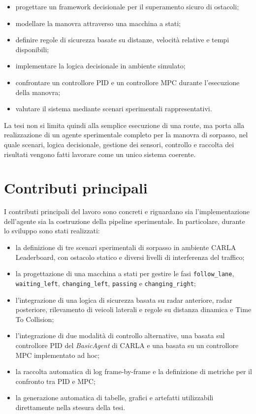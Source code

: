 \begin{itemize}
    \item progettare un framework decisionale per il superamento sicuro di ostacoli;
    \item modellare la manovra attraverso una macchina a stati;
    \item definire regole di sicurezza basate su distanze, velocità relative e tempi disponibili;
    \item implementare la logica decisionale in ambiente simulato;
    \item confrontare un controllore PID e un controllore MPC durante l'esecuzione della manovra;
    \item valutare il sistema mediante scenari sperimentali rappresentativi.
\end{itemize}

La tesi non si limita quindi alla semplice esecuzione di una route, ma porta alla realizzazione di un agente sperimentale completo per la manovra di sorpasso, nel quale scenari, logica decisionale, gestione dei sensori, controllo e raccolta dei risultati vengono fatti lavorare come un unico sistema coerente.

\section{Contributi principali}

I contributi principali del lavoro sono concreti e riguardano sia l'implementazione dell'agente sia la costruzione della pipeline sperimentale. In particolare, durante lo sviluppo sono stati realizzati:

\begin{itemize}
    \item la definizione di tre scenari sperimentali di sorpasso in ambiente CARLA Leaderboard, con ostacolo statico e diversi livelli di interferenza del traffico;
    \item la progettazione di una macchina a stati per gestire le fasi \texttt{follow\_lane}, \texttt{waiting\_left}, \texttt{changing\_left}, \texttt{passing} e \texttt{changing\_right};
    \item l'integrazione di una logica di sicurezza basata su radar anteriore, radar posteriore, rilevamento di veicoli laterali e regole su distanza dinamica e Time To Collision;
    \item l'integrazione di due modalità di controllo alternative, una basata sul controllore PID del \textit{BasicAgent} di CARLA e una basata su un controllore MPC implementato ad hoc;
    \item la raccolta automatica di log frame-by-frame e la definizione di metriche per il confronto tra PID e MPC;
    \item la generazione automatica di tabelle, grafici e artefatti utilizzabili direttamente nella stesura della tesi.
\end{itemize}

